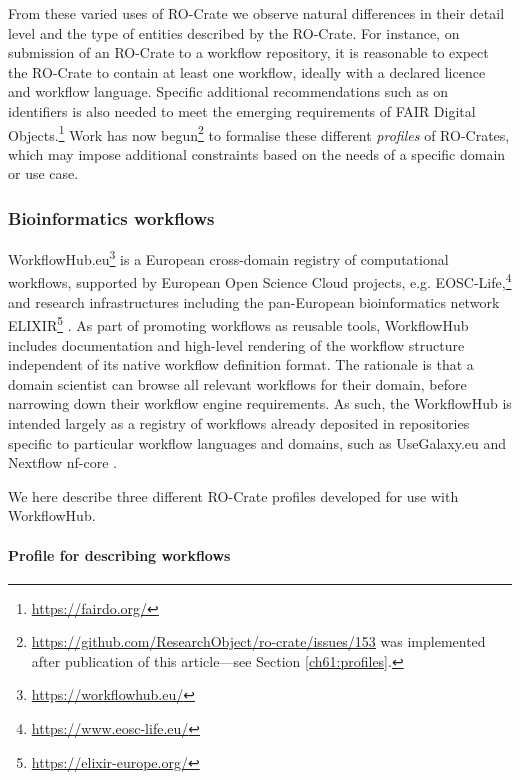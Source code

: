 From these varied uses of RO-Crate we observe natural differences in
their detail level and the type of entities described by the RO-Crate.
For instance, on submission of an RO-Crate to a workflow repository, it
is reasonable to expect the RO-Crate to contain at least one workflow,
ideally with a declared licence and workflow language. Specific
additional recommendations such as on identifiers is also needed to meet
the emerging requirements of FAIR Digital
Objects.\footnote{\url{https://fairdo.org/}} Work has now
begun\footnote{\url{https://github.com/ResearchObject/ro-crate/issues/153} was implemented after publication of this article---see Section \vref{ch61:profiles}.} to
formalise these different \textit{profiles} of RO-Crates, which may impose
additional constraints based on the needs of a specific domain or use case.


\subsubsection{Bioinformatics workflows}\label{ch5:workflows}

WorkflowHub.eu\footnote{\url{https://workflowhub.eu/}} is a European cross-domain
registry of computational workflows, supported by European Open Science
Cloud projects, e.g. EOSC-Life,\footnote{\url{https://www.eosc-life.eu/}} and
research infrastructures including the pan-European bioinformatics
network ELIXIR\footnote{\url{https://elixir-europe.org/}}
\cite{Crosswell 2012}. As part
of promoting workflows as reusable tools, WorkflowHub includes
documentation and high-level rendering of the workflow structure
independent of its native workflow definition format. The rationale is
that a domain scientist can browse all relevant workflows for their
domain, before narrowing down their workflow engine requirements. As
such, the WorkflowHub is intended largely as a registry of workflows
already deposited in repositories specific to particular workflow
languages and domains, such as UseGalaxy.eu
\cite{Baker 2020} and
Nextflow nf-core
\cite{Ewels 2020}.

We here describe three different RO-Crate profiles developed for use
with WorkflowHub.

\paragraph{Profile for describing workflows}
\label{ch5:profile-for-describing-workflows}

